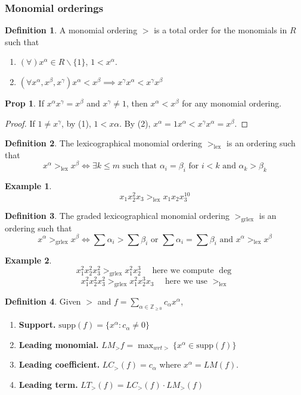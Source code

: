 \documentclass{article}
\theoremstyle{definition}
\newtheorem*{prop}{Prop}
\newtheorem*{defn}{Definition}
\newtheorem{ex}{Example}
\newcommand{\Z}{\mathbb{Z}}
\newcommand{\supp}{\text{supp}}
\newcommand{\lex}{\text{lex}}
\newcommand{\grlex}{\text{grlex}}
\begin{document}
\subsubsection{Monomial orderings}
\begin{defn}
	A monomial ordering $>$ is a total order for the monomials in $R$ such that
	\begin{enumerate}
		\item $(\forall) x^\alpha\in R\backslash\{1\}$, $1<x^\alpha$.
		\item $(\forall x^\alpha, x^\beta,x^\gamma) x^\alpha<x^\beta\implies x^\gamma x^\alpha< x^\gamma x^\beta$
	\end{enumerate}
\end{defn}
\begin{prop}
	If $x^\alpha x^\gamma=x^\beta$ and $x^\gamma \neq 1$, then $x^\alpha< x^\beta$ for any monomial ordering.
	\begin{proof}
		If $1\neq x^\gamma$, by (1), $1<x\alpha$. By (2), $x^\alpha=1x^\alpha<x^\gamma x^\alpha=x^\beta$.
	\end{proof}
\end{prop}
\begin{defn}
	The lexicographical monomial ordering $>_{\lex}$ is an ordering such that 
	$$
	x^\alpha >_\lex x^\beta \iff \exists k\leq m \text{ such that }\alpha_i=\beta_i \text{ for } i<k \text{ and } \alpha_k>\beta_k
	$$
\end{defn}
\begin{ex}
  $$x_1x_2^2x_3>_\lex x_1x_2x_3^{10}$$
\end{ex}
\begin{defn}
	The graded lexicographical monomial ordering $>_{\grlex}$ is an ordering such that 
	$$
	x^\alpha >_\grlex x^\beta \iff \sum\alpha_i>\sum\beta_i\text{ or }\sum\alpha_i=\sum\beta_i\text{ and }x^\alpha>_\lex x^\beta
	$$
\end{defn}
\begin{ex}
	$$x_1^2x_2^2x_3^2>_\grlex x_1^2x_2^3\quad \text{ here we compute }\deg$$
	$$x_1^2x_2^2x_3^2>_\grlex x_1^2x_2^3x_3\quad \text{ here we use }>_\lex$$
\end{ex}
\begin{defn}
	Given $>$ and $f=\sum_{\alpha \in\Z_{\geq0}}c_\alpha x^\alpha$,
	\begin{enumerate}
		\item \textbf{Support.} $\supp(f)=\{x^\alpha:c_\alpha\neq0\}$
		\item \textbf{Leading monomial.} $LM_>f=\max_{wrt>}\{x^\alpha\in\supp(f)\}$
		\item \textbf{Leading coefficient.} $LC_>(f)=c_\alpha$ where $x^\alpha=LM(f)$.
		\item \textbf{Leading term.} $LT_>(f)=LC_>(f)·LM_>(f)$
	\end{enumerate}	
\end{defn}
\end{document}

